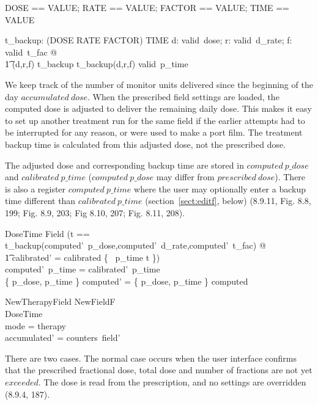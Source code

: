 \begin{zed}
	DOSE == VALUE; RATE == VALUE; FACTOR == VALUE; TIME == VALUE
\end{zed}

\begin{axdef}
	t\_backup: (DOSE \cross RATE \cross FACTOR) \pfun TIME
\where
	\forall d: valid~dose; r: valid~d\_rate; f: valid~t\_fac @ \\
\t1	 (d,r,f) \in \dom t\_backup \land t\_backup(d,r,f) \in valid~p\_time
\end{axdef}
We keep track of the number of monitor units delivered since the
beginning of the day $accumulated~dose$.  When the prescribed field
settings are loaded, the computed dose is adjusted to deliver the
remaining daily dose.  This makes it easy to set up another treatment
run for the same field if the earlier attempts had to be interrupted for
any reason, or were used to make a port film.  The treatment backup time is
calculated from this adjusted dose, not the prescribed dose.

The adjusted dose and corresponding backup time are stored in
$computed~p\_dose$ and $calibrated~p\_time$ ($computed~p\_dose$ may
differ from $prescribed~dose$).  There is also a register
$computed~p\_time$ where the user may optionally enter a backup time
different than $calibrated~p\_time$ (section~\ref{sect:editf}, below)
(8.9.11, Fig. 8.8, 199; Fig. 8.9, 203; Fig 8.10, 207; Fig. 8.11, 208).

\begin{schema}{DoseTime}
	\Delta Field
\where
(\LET t == t\_backup(computed'~p\_dose,computed'~d\_rate,computed'~t\_fac) @ \\
\t1	calibrated' = calibrated \oplus \{ ~p\_time \mapsto t \}) \\
	computed'~p\_time = calibrated'~p\_time \\
	\{ p\_dose, p\_time \} \ndres computed' = \{ p\_dose, p\_time \} \ndres computed
\end{schema}
	
\begin{schema}{NewTherapyField}
	NewFieldF \\
	DoseTime \\
\where
	mode = therapy \\
	accumulated' = counters~field' \\ 
\end{schema}
There are two cases.  The normal case occurs when the user interface
confirms that the prescribed fractional
dose, total dose and number of fractions are not yet $exceeded$. The
dose is read from the prescription, and no
settings are overridden (8.9.4, 187).


